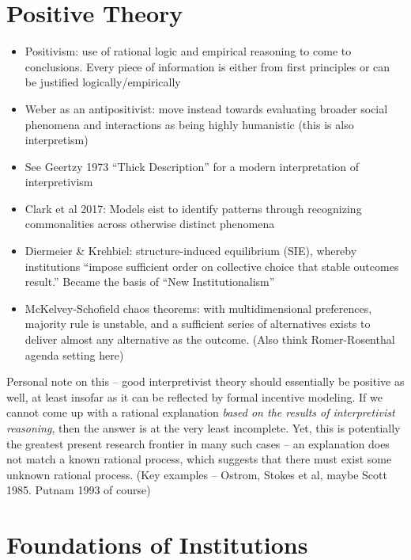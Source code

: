 \documentclass[12pt]{article}
\begin{document}
\section*{Positive Theory}


\begin{itemize}
    \item Positivism: use of rational logic and empirical reasoning to come to conclusions. Every piece of information is either from first principles or can be justified logically/empirically
    \item Weber as an antipositivist: move instead towards evaluating broader social phenomena and interactions as being highly humanistic (this is also interpretism)
    \item See Geertzy 1973 ``Thick Description'' for a modern interpretation of interpretivism
    \item Clark et al 2017: Models eist to identify patterns through recognizing commonalities across otherwise distinct phenomena
    \item Diermeier \& Krehbiel: structure-induced equilibrium (SIE), whereby institutions ``impose sufficient order on collective choice that stable outcomes result.'' Became the basis of ``New Institutionalism''
    \item McKelvey-Schofield chaos theorems: with multidimensional preferences, majority rule is unstable, and a sufficient series of alternatives exists to deliver almost any alternative as the outcome. (Also think Romer-Rosenthal agenda setting here)
\end{itemize}


Personal note on this -- good interpretivist theory should essentially be positive as well, at least insofar as it can be reflected by formal incentive modeling. If we cannot come up with a rational explanation \emph{based on the results of interpretivist reasoning}, then the answer is at the very least incomplete. Yet, this is potentially the greatest present research frontier in many such cases -- an explanation does not match a known rational process, which suggests that there must exist some unknown rational process. (Key examples -- Ostrom, Stokes et al, maybe Scott 1985. Putnam 1993 of course)





\section*{Foundations of Institutions}
\end{document}
